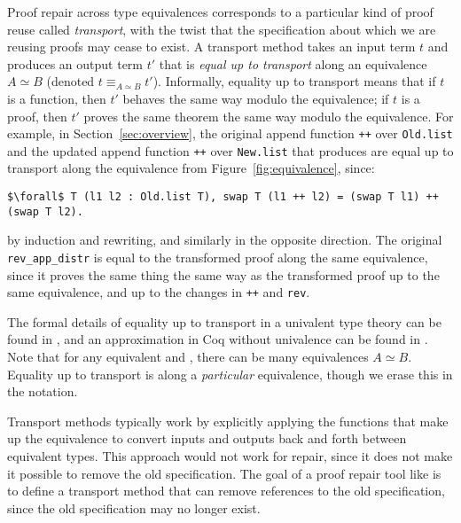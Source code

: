 Proof repair across type equivalences corresponds to a particular kind of proof reuse called \textit{transport},
with the twist that the specification about which we are reusing proofs may cease to exist.
A transport method takes an input term $t$ and produces an output term $t'$ that is \textit{equal up to transport}
along an equivalence $A \simeq B$ (denoted $t \equiv_{A \simeq B} t'$).
Informally, equality up to transport means that if $t$ is a function, then $t'$ behaves the same way modulo the equivalence;
if $t$ is a proof, then $t'$ proves the same theorem the same way modulo the equivalence.
For example, in Section~\ref{sec:overview}, the original append function \lstinline{++} over \lstinline{Old.list}
and the updated append function \lstinline{++} over \lstinline{New.list} that \toolname produces are
equal up to transport along the equivalence from Figure~\ref{fig:equivalence}, since:

\begin{lstlisting}
$\forall$ T (l1 l2 : Old.list T), swap T (l1 ++ l2) = (swap T l1) ++ (swap T l2).
\end{lstlisting}
by induction and rewriting, and similarly in the opposite direction.
The original \lstinline{rev_app_distr} is equal to the transformed proof along the same equivalence,
since it proves the same thing the same way as the transformed proof up to the same equivalence, and up to the changes in \lstinline{++}
and \lstinline{rev}.

The formal details of equality up to transport in a univalent type theory can be found in \citet{univalent2013homotopy}, and an approximation in Coq without univalence can be found in \citet{tabareau2017equivalences}.
Note that for any equivalent \A and \B, there can be many equivalences $A \simeq B$.
Equality up to transport is along a \textit{particular} equivalence, though we erase this in the notation.

Transport methods typically work by explicitly applying the functions that make up the equivalence to convert
inputs and outputs back and forth between equivalent types.
This approach would not work for repair, since it does not make it possible to remove the old specification.
The goal of a proof repair tool like \toolname is to define a transport method that
can remove references to the old specification, %
since the old specification may no longer exist.

